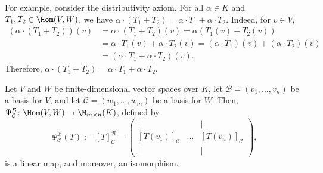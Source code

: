 For example, consider the distributivity axiom. For all $\alpha \in K$ and $T_1, T_2 \in \Hom(V,W)$, we have $\alpha \cdot (T_1 + T_2) = \alpha \cdot T_1 + \alpha \cdot T_2$. Indeed, for $v \in V$,
\begin{align*}
  (\alpha \cdot (T_1 + T_2))(v) &= \alpha \cdot (T_1 + T_2)(v) = \alpha(T_1(v) + T_2(v)) \\
  &= \alpha \cdot T_1(v) + \alpha \cdot T_2(v) = (\alpha \cdot T_1)(v) + (\alpha \cdot T_2)(v) \\
  &= (\alpha \cdot T_1 + \alpha \cdot T_2)(v).
\end{align*}
Therefore, $\alpha \cdot (T_1 + T_2) = \alpha \cdot T_1 + \alpha \cdot T_2$.

\begin{theorem}
  \label{thm:homomorphism_isomorphism}
  Let $V$ and $W$ be finite-di\-men\-sional vector spaces over $K$, let $\mathcal{B} = (v_1, \dots, v_n)$ be a basis for $V$, and let $\mathcal{C} = (w_1, \dots, w_m)$ be a basis for $W$. Then, $\Psi_{\mathcal{C}}^{\mathcal{B}} \colon \Hom(V,W) \to \M_{m \times n}(K)$, defined by
  \[ \Psi_{\mathcal{C}}^{\mathcal{B}}(T) := [T]_{\mathcal{C}}^{\mathcal{B}} = \begin{pmatrix} | & & | \\ [T(v_1)]_{\mathcal{C}} & \dots & [T(v_n)]_{\mathcal{C}} \\ | & & | \end{pmatrix}, \]
  is a linear map, and moreover, an isomorphism.
\end{theorem}

